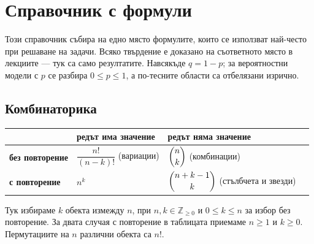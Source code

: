 \chapter{Справочник с формули}
\label{app:formulas}

Този справочник събира на едно място формулите, които се използват най-често при
решаване на задачи. Всяко твърдение е доказано на съответното място в лекциите —
тук са само резултатите. Навсякъде $q=1-p$; за вероятностни модели с $p$ се
разбира $0\le p\le1$, а по-тесните области са отбелязани изрично.

\section{Комбинаторика}

\begin{center}
\small
\begin{tabular}{@{}llll@{}}
\toprule
& \textbf{редът има значение} & \textbf{редът няма значение} \\
\midrule
\textbf{без повторение} & $\dfrac{n!}{(n-k)!}$ (вариации) & $\dbinom{n}{k}$ (комбинации) \\[10pt]
\textbf{с повторение}   & $n^k$ & $\dbinom{n+k-1}{k}$ (стълбчета и звезди) \\
\bottomrule
\end{tabular}
\end{center}

\noindent
Тук избираме $k$ обекта измежду $n$, при $n,k\in\mathbb Z_{\ge0}$ и
$0\le k\le n$ за избор без повторение. За двата случая с повторение в
таблицата приемаме $n\ge1$ и $k\ge0$. Пермутациите на $n$ различни обекта са $n!$.

